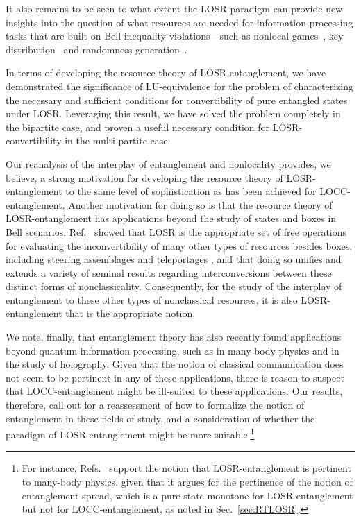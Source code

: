 \documentclass[prx,11pt,letterpaper,twocolumn,accepted=2023-11-27]{quantumarticle}
\theoremstyle{plain}
\theoremstyle{definition}
\begin{document}
 It also remains to be seen to what extent the LOSR paradigm can provide
 new insights into the question of what resources are needed for information-processing tasks that are built on Bell inequality violations---such as nonlocal games~\cite{Broadbent2006,Palazuelos2016,Johnston2016}, key distribution~\cite{BHK,Acin2006QKD,Scarani2006QKD,Acin2007QKD,vazirani14,Kaniewski2016chsh} and randomness generation~\cite{Colbeckthesis,colbeckamp,Pironio2010,Dhara2013DIRNG}.


In terms of developing the resource theory of LOSR-entanglement, we have demonstrated the significance of LU-equivalence for the problem of characterizing the necessary and sufficient conditions for convertibility of pure entangled states under LOSR.  Leveraging this result, we have solved the problem completely in the bipartite case, and proven a useful necessary condition for LOSR-convertibility in the multi-partite case. 

 
Our reanalysis of the interplay of entanglement and nonlocality provides, we believe,  a strong motivation for developing the resource theory of LOSR-entanglement to the same level of sophistication as has been achieved for LOCC-entanglement.   Another motivation for doing so is that the resource theory of LOSR-entanglement has  applications beyond the study of states and boxes in Bell scenarios.
    Ref.~\cite{semiquantum} showed that LOSR is the appropriate set of free operations for evaluating the inconvertibility of many other types of resources besides boxes,  including steering assemblages \cite{Einstein1935,Schrodinger1935,wisesteer,Zjawin2023quantifyingepr,Zjawin2023resourcetheoryof} and teleportages \cite{telep, PhysRevA.99.032334,Hoban_2018}, and that doing so
      unifies and extends a variety of seminal results regarding interconversions between these distinct forms of nonclassicality. Consequently, for the study of 
      the interplay of entanglement to 
      these other types of nonclassical resources, it is also LOSR-entanglement that is the appropriate notion.

We note, finally,  that entanglement theory has also recently found applications beyond quantum information processing, such as in many-body physics and in the study of holography.  Given that the notion of classical communication does not seem to be pertinent in any of these applications, there is reason to suspect that LOCC-entanglement might be ill-suited to these applications. 
Our results, therefore, call out for a reassessment of how to formalize the notion of entanglement in these fields of study, 
 and a consideration of whether the paradigm of LOSR-entanglement might be more suitable.\footnote{For instance, Refs.~\cite{Harrow2010,anshu2022entanglement} support the notion that LOSR-entanglement is pertinent to many-body physics, given that it argues for the pertinence of the notion of entanglement spread, which is a 
 pure-state monotone for LOSR-entanglement but not for LOCC-entanglement,
   as noted in Sec.~\ref{sec:RTLOSR}.} 
\end{document}
